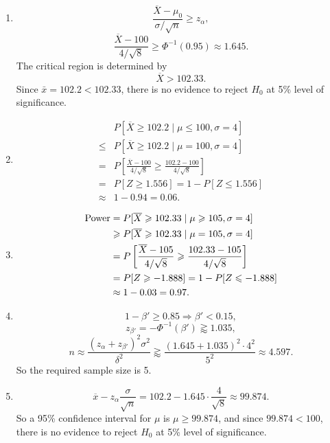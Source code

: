 \documentclass[11pt,a4paper]{article}
\begin{document}
\begin{enumerate}[label=\roman*)]
\item
$$\frac{\overline{X}-\mu_0}{\sigma/\sqrt{n}}\geqslant z_{\alpha},$$
$$\frac{\overline{X}-100}{4/\sqrt{8}}\geqslant\Phi^{-1}(0.95)\approx1.645.$$
The critical region is determined by
$$\overline{X}>102.33.$$
Since $\bar{x}=102.2<102.33$, there is no evidence to reject $H_0$ at 5\% level of significance.
\item
\begin{align*}
&P[\overline{X}\geqslant 102.2\mid \mu\leqslant 100,\sigma=4]\\
\leqslant & P[\overline{X}\geqslant 102.2\mid \mu=100,\sigma=4]\\
=&P\left[\frac{\overline{X}-100}{4/\sqrt{8}}\geqslant\frac{102.2-100}{4/\sqrt{8}}\right]\\
=&P[Z\geqslant 1.556]=1-P[Z\leqslant1.556]\\
\approx&1-0.94=0.06.
\end{align*}
\item
\begin{align*}
{\rm Power}&=P[\overline{X}\geqslant 102.33\mid \mu\geqslant 105,\sigma=4]\\
&\geqslant P[\overline{X}\geqslant 102.33\mid \mu=105,\sigma=4]\\
&=P\left[\frac{\overline{X}-105}{4/\sqrt{8}}\geqslant\frac{102.33-105}{4/\sqrt{8}}\right]\\
&=P[Z\geqslant -1.888]=1-P[Z\leqslant -1.888]\\
&\approx 1-0.03=0.97.
\end{align*}
\item
$$1-\beta'\geqslant0.85\Longrightarrow\beta'<0.15,$$
$$z_{\beta'}=-\Phi^{-1}(\beta')\gtrapprox 1.035,$$
$$n\approx\frac{(z_\alpha+z_{\beta'})^2\sigma^2}{\delta^2}\gtrapprox\frac{(1.645+1.035)^2\cdot4^2}{5^2}\approx4.597.$$
So the required sample size is 5.
\item
$$\overline{x}-z_\alpha\frac{\sigma}{\sqrt{n}}=102.2-1.645\cdot\frac{4}{\sqrt{8}}\approx99.874.$$
So a 95\% confidence interval for $\mu$ is $\mu\geqslant99.874$, and since $99.874<100$, there is no evidence to reject $H_0$ at 5\% level of significance.
\end{enumerate}
\end{document}
